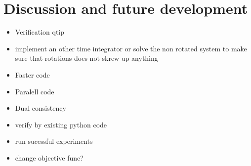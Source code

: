 \documentclass[11pt]{article}
\begin{document}
\section{Discussion and future development}
\begin{itemize}
  \item Verification qtip
  \item implement an other time integrator or solve the non rotated system to make sure that rotations does not skrew up anything
  \item Faster code
  \item Paralell code
  \item Dual consistency
  \item verify by existing python code
  \item run sucessful experiments
  \item change objective func? 
\end{itemize}



\end{document}
